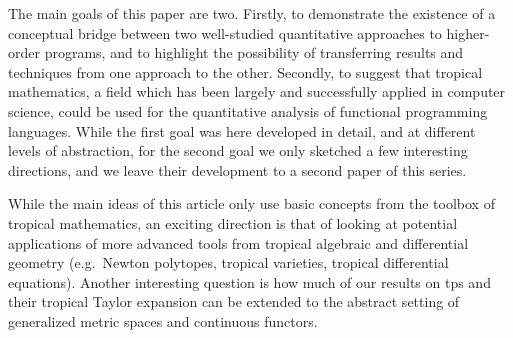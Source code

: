 
%
%
%

The main goals of this paper are two. Firstly,  to
demonstrate the existence of a conceptual bridge between two well-studied quantitative approaches to higher-order programs, and to highlight the possibility of transferring results and techniques from one approach to the other. 
Secondly, to suggest that tropical mathematics, a
field which has been largely and successfully applied in computer science, could be used for the quantitative analysis of functional programming languages. 
While the first goal was here developed in detail, and at different levels of abstraction, for the second goal we only sketched a few interesting directions, and we leave their development to a second paper of this series. 

While the main ideas of this article only use basic concepts from the toolbox of tropical mathematics, an exciting direction is that of looking at potential applications of more advanced tools from tropical algebraic and differential geometry (e.g.~Newton polytopes, tropical varieties, tropical differential equations). Another interesting question is how much of our results on tps and their tropical Taylor expansion can be extended to the abstract setting of generalized metric spaces and continuous functors. 

